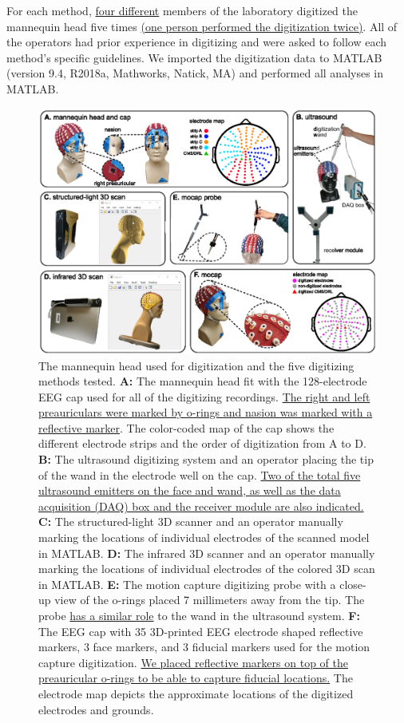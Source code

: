 \documentclass[../thesis_seyed.tex]{subfiles}
\begin{document}
For each method, \ul{four different} members of the laboratory digitized the mannequin head five times \ul{(one person performed the digitization twice)}. All of the operators had prior experience in digitizing and were asked to follow each method's specific guidelines. We imported the digitization data to MATLAB (version 9.4, R2018a, Mathworks, Natick, MA) and performed all analyses in MATLAB.

\begin{figure}[H]
    \centering
    \includegraphics[width=\linewidth]{../img/method1-r2.eps}
    \caption{The mannequin head used for digitization and the five digitizing methods tested. \textbf{A:} The mannequin head fit with the 128-electrode EEG cap used for all of the digitizing recordings. \ul{The right and left preauriculars were marked by o-rings and nasion was marked with a reflective marker}. The color-coded map of the cap shows the different electrode strips and the order of digitization from A to D. \textbf{B:} The ultrasound digitizing system and an operator placing the tip of the wand in the electrode well on the cap. \ul{Two of the total five ultrasound emitters on the face and wand, as well as the data acquisition (DAQ) box and the receiver module are also indicated.} \textbf{C:} The structured-light 3D scanner and an operator manually marking the locations of individual electrodes of the scanned model in MATLAB. \textbf{D:} The infrared 3D scanner and an operator manually marking the locations of individual electrodes of the colored 3D scan in MATLAB. \textbf{E:} The motion capture digitizing probe with a close-up view of the o-rings placed 7 millimeters away from the tip. The probe \ul{has a similar role} to the wand in the ultrasound system. \textbf{F:} The EEG cap with 35 3D-printed EEG electrode shaped reflective markers, 3 face markers, and 3 fiducial markers used for the motion capture digitization. \ul{We placed reflective markers on top of the preauricular o-rings to be able to capture fiducial locations.} The electrode map depicts the approximate locations of the digitized electrodes and grounds.}
    \label{fig:m1}
\end{figure}
\end{document}
